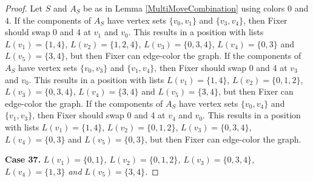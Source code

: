 \documentclass[12pt]{amsart}
\theoremstyle{plain}
\theoremstyle{definition}
\theoremstyle{remark}
\begin{document}
\begin{proof}
Let $S$ and $A_S$ be as in Lemma \ref{MultiMoveCombination} using colors $0$ and $4$. If the components of $A_S$ have vertex sets $\{v_0, v_1\}$ and $\{v_3, v_4\}$, then Fixer should swap 0 and 4 at $v_1$ and $v_0$. This results in a position with lists $L(v_1) = \{1, 4\}$, $L(v_2) = \{1, 2, 4\}$, $L(v_3) = \{0, 3, 4\}$, $L(v_4) = \{0, 3\}$ and $L(v_5) = \{3, 4\}$, but then Fixer can edge-color the graph.
If the components of $A_S$ have vertex sets $\{v_0, v_3\}$ and $\{v_1, v_4\}$, then Fixer should swap 0 and 4 at $v_3$ and $v_0$. This results in a position with lists $L(v_1) = \{1, 4\}$, $L(v_2) = \{0, 1, 2\}$, $L(v_3) = \{0, 3, 4\}$, $L(v_4) = \{3, 4\}$ and $L(v_5) = \{3, 4\}$, but then Fixer can edge-color the graph.
If the components of $A_S$ have vertex sets $\{v_0, v_4\}$ and $\{v_1, v_3\}$, then Fixer should swap 0 and 4 at $v_4$ and $v_0$. This results in a position with lists $L(v_1) = \{1, 4\}$, $L(v_2) = \{0, 1, 2\}$, $L(v_3) = \{0, 3, 4\}$, $L(v_4) = \{0, 3\}$ and $L(v_5) = \{0, 3\}$, but then Fixer can edge-color the graph.

\noindent\textbf{Case 37.  }\textit{$L(v_1) = \{0, 1\}$, $L(v_2) = \{0, 1, 2\}$, $L(v_3) = \{0, 3, 4\}$, $L(v_4) = \{1, 3\}$ and $L(v_5) = \{3, 4\}$.}


\end{proof}
\end{document}
